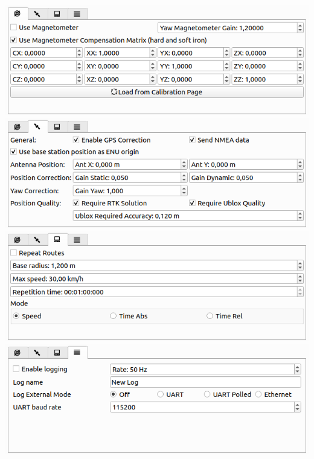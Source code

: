 \documentclass[12pt]{article} %
\begin{document}
\noindent\begin{minipage}{0.4\textwidth}
\noindent \includegraphics[width=\textwidth]{./screens/car_settings_mag.png}
\noindent \includegraphics[width=\textwidth]{./screens/car_settings_gps.png}
\noindent \includegraphics[width=\textwidth]{./screens/car_settings_auto.png}
\noindent \includegraphics[width=\textwidth]{./screens/car_settings_log.png}
\end{minipage}
\end{document}
